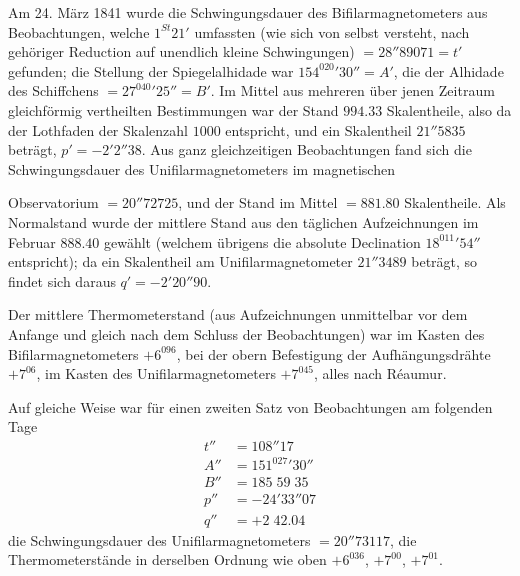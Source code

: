 Am 24. März 1841 wurde die Schwingungsdauer des Bifilarmagnetometers aus Beobachtungen, welche $1^{St}21'$ umfassten (wie sich von selbst versteht, nach gehöriger Reduction auf unendlich kleine Schwingungen) $=28''89071=t'$ gefunden; die Stellung der Spiegelalhidade war $154^020'30''=A'$, die der Alhidade des Schiffchens $=27^040'25''=B'$. Im Mittel aus mehreren über jenen Zeitraum gleichförmig vertheilten Bestimmungen war der Stand $994.33$ Skalentheile, also da der Lothfaden der Skalenzahl $1000$ entspricht, und ein Skalentheil $21''5835$ beträgt, $p'=-2'2''38$. Aus ganz gleichzeitigen Beobachtungen fand sich die Schwingungsdauer des Unifilarmagnetometers im magnetischen
\par\clearpage
{}
\noindent Observatorium $=20''72725$, und der Stand im Mittel $=881.80$ Skalentheile. Als Normalstand wurde der mittlere Stand aus den täglichen Aufzeichnungen im Februar $888.40$ gewählt (welchem übrigens die absolute Declination $18^011'54''$ entspricht); da ein Skalentheil am Unifilarmagnetometer $21''3489$ beträgt, so findet sich daraus $q'=-2'20''90$.

Der mittlere Thermometerstand (aus Aufzeichnungen unmittelbar vor dem Anfange und gleich nach dem Schluss der Beobachtungen) war im Kasten des Bifilarmagnetometers $+6^096$, bei der obern Befestigung der Aufhängungsdrähte $+7^06$, im Kasten des Unifilarmagnetometers $+7^045$, alles nach Réaumur.

Auf gleiche Weise war für einen zweiten Satz von Beobachtungen am folgenden Tage
\[
\begin{aligned}
t''&=108''17\\
A''&=151^027'30''\\
B''&=185\;59\;35\\
p''&=-24'33''07\\
q''&=+2\;42.04
\end{aligned}
\]
die Schwingungsdauer des Unifilarmagnetometers $=20''73117$, die Thermometerstände in derselben Ordnung wie oben $+6^036$, $+7^00$, $+7^01$.

